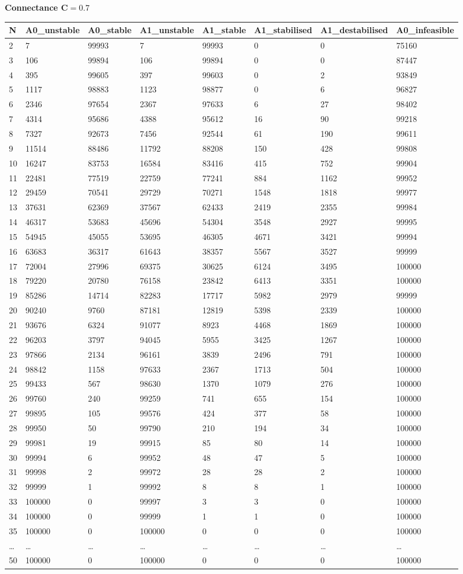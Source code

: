 \documentclass[]{article}
\begin{document}
\textbf{Connectance \(\mathbf{C = 0.7}\)}

\begin{longtable}[]{@{}llllllll@{}}
\toprule
N & A0\_unstable & A0\_stable & A1\_unstable & A1\_stable &
A1\_stabilised & A1\_destabilised & A0\_infeasible\tabularnewline
\midrule
\endhead
2 & 7 & 99993 & 7 & 99993 & 0 & 0 & 75160\tabularnewline
3 & 106 & 99894 & 106 & 99894 & 0 & 0 & 87447\tabularnewline
4 & 395 & 99605 & 397 & 99603 & 0 & 2 & 93849\tabularnewline
5 & 1117 & 98883 & 1123 & 98877 & 0 & 6 & 96827\tabularnewline
6 & 2346 & 97654 & 2367 & 97633 & 6 & 27 & 98402\tabularnewline
7 & 4314 & 95686 & 4388 & 95612 & 16 & 90 & 99218\tabularnewline
8 & 7327 & 92673 & 7456 & 92544 & 61 & 190 & 99611\tabularnewline
9 & 11514 & 88486 & 11792 & 88208 & 150 & 428 & 99808\tabularnewline
10 & 16247 & 83753 & 16584 & 83416 & 415 & 752 & 99904\tabularnewline
11 & 22481 & 77519 & 22759 & 77241 & 884 & 1162 & 99952\tabularnewline
12 & 29459 & 70541 & 29729 & 70271 & 1548 & 1818 & 99977\tabularnewline
13 & 37631 & 62369 & 37567 & 62433 & 2419 & 2355 & 99984\tabularnewline
14 & 46317 & 53683 & 45696 & 54304 & 3548 & 2927 & 99995\tabularnewline
15 & 54945 & 45055 & 53695 & 46305 & 4671 & 3421 & 99994\tabularnewline
16 & 63683 & 36317 & 61643 & 38357 & 5567 & 3527 & 99999\tabularnewline
17 & 72004 & 27996 & 69375 & 30625 & 6124 & 3495 & 100000\tabularnewline
18 & 79220 & 20780 & 76158 & 23842 & 6413 & 3351 & 100000\tabularnewline
19 & 85286 & 14714 & 82283 & 17717 & 5982 & 2979 & 99999\tabularnewline
20 & 90240 & 9760 & 87181 & 12819 & 5398 & 2339 & 100000\tabularnewline
21 & 93676 & 6324 & 91077 & 8923 & 4468 & 1869 & 100000\tabularnewline
22 & 96203 & 3797 & 94045 & 5955 & 3425 & 1267 & 100000\tabularnewline
23 & 97866 & 2134 & 96161 & 3839 & 2496 & 791 & 100000\tabularnewline
24 & 98842 & 1158 & 97633 & 2367 & 1713 & 504 & 100000\tabularnewline
25 & 99433 & 567 & 98630 & 1370 & 1079 & 276 & 100000\tabularnewline
26 & 99760 & 240 & 99259 & 741 & 655 & 154 & 100000\tabularnewline
27 & 99895 & 105 & 99576 & 424 & 377 & 58 & 100000\tabularnewline
28 & 99950 & 50 & 99790 & 210 & 194 & 34 & 100000\tabularnewline
29 & 99981 & 19 & 99915 & 85 & 80 & 14 & 100000\tabularnewline
30 & 99994 & 6 & 99952 & 48 & 47 & 5 & 100000\tabularnewline
31 & 99998 & 2 & 99972 & 28 & 28 & 2 & 100000\tabularnewline
32 & 99999 & 1 & 99992 & 8 & 8 & 1 & 100000\tabularnewline
33 & 100000 & 0 & 99997 & 3 & 3 & 0 & 100000\tabularnewline
34 & 100000 & 0 & 99999 & 1 & 1 & 0 & 100000\tabularnewline
35 & 100000 & 0 & 100000 & 0 & 0 & 0 & 100000\tabularnewline
\ldots{} & \ldots{} & \ldots{} & \ldots{} & \ldots{} & \ldots{} &
\ldots{} & \ldots{}\tabularnewline
50 & 100000 & 0 & 100000 & 0 & 0 & 0 & 100000\tabularnewline
\bottomrule
\end{longtable}
\end{document}
